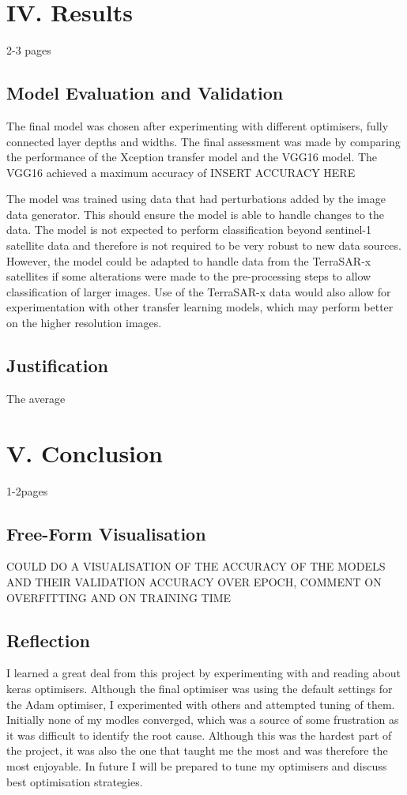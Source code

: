 \documentclass{article}
\begin{document}
\section{IV. Results}
2-3 pages
\subsection{Model Evaluation and Validation}
The final model was chosen after experimenting with different optimisers, fully connected layer depths and widths. The final assessment was made by comparing the performance of the Xception transfer model and the VGG16 model. The VGG16 achieved a maximum accuracy of INSERT ACCURACY HERE
	
	
The model was trained using data that had perturbations added by the image data generator. This should ensure the model is able to handle changes to the data. The model is not expected to perform classification beyond sentinel-1 satellite data and therefore is not required to be very robust to new data sources. However, the model could be adapted to handle data from the TerraSAR-x satellites if some alterations were made to the pre-processing steps to allow classification of larger images. Use of the TerraSAR-x data would also allow for experimentation with other transfer learning models, which may perform better on the higher resolution images. 

\subsection{Justification}
The average 
\section{V. Conclusion}
1-2pages
\subsection{Free-Form Visualisation}

COULD DO A VISUALISATION OF THE ACCURACY OF THE MODELS AND THEIR VALIDATION ACCURACY OVER EPOCH, COMMENT ON OVERFITTING AND ON TRAINING TIME
\subsection{Reflection}
I learned a great deal from this project by experimenting with and reading about keras optimisers. Although the final optimiser was using the default settings for the Adam optimiser, I experimented with others and attempted tuning of them. Initially none of my modles converged, which was a source of some frustration as it was difficult to identify the root cause. Although this was the hardest part of the project, it was also the one that taught me the most and was therefore the most enjoyable. In future I will be prepared to tune my optimisers and discuss best optimisation strategies. 
\end{document}
